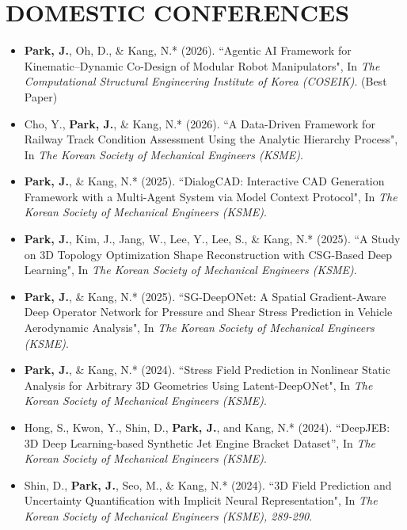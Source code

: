 \documentclass[a4paper,10pt]{article}
\begin{document}
\section*{DOMESTIC CONFERENCES}
\begin{itemize}[left=0pt]
    \item \textbf{Park, J.}, Oh, D., \& Kang, N.* (2026). “Agentic AI Framework for Kinematic--Dynamic Co-Design of Modular Robot Manipulators", In \textit{The Computational Structural Engineering Institute of Korea (COSEIK)}. (Best Paper)

    \item Cho, Y., \textbf{Park, J.}, \& Kang, N.* (2026). “A Data-Driven Framework for Railway Track Condition Assessment Using the Analytic Hierarchy Process", In \textit{The Korean Society of Mechanical Engineers (KSME)}.

    \item \textbf{Park, J.}, \& Kang, N.* (2025). “DialogCAD: Interactive CAD Generation Framework with a Multi-Agent System via Model Context Protocol", In \textit{The Korean Society of Mechanical Engineers (KSME)}.

    \item \textbf{Park, J.}, Kim, J., Jang, W., Lee, Y., Lee, S., \& Kang, N.* (2025). “A Study on 3D Topology Optimization Shape Reconstruction with CSG-Based Deep Learning", In \textit{The Korean Society of Mechanical Engineers (KSME)}.

    \item \textbf{Park, J.}, \& Kang, N.* (2025). “SG-DeepONet: A Spatial Gradient-Aware Deep Operator Network for Pressure and Shear Stress Prediction in Vehicle Aerodynamic Analysis", In \textit{The Korean Society of Mechanical Engineers (KSME)}.
    
    \item \textbf{Park, J.}, \& Kang, N.* (2024). “Stress Field Prediction in Nonlinear Static Analysis for Arbitrary 3D Geometries Using Latent-DeepONet", In \textit{The Korean Society of Mechanical Engineers (KSME)}.
    
    \item Hong, S., Kwon, Y., Shin, D., \textbf{Park, J.}, and Kang, N.* (2024). “DeepJEB: 3D Deep Learning-based Synthetic Jet Engine Bracket Dataset”, In \textit{The Korean Society of Mechanical Engineers (KSME)}.
    
    \item Shin, D., \textbf{Park, J.}, Seo, M., \& Kang, N.* (2024). “3D Field Prediction and Uncertainty Quantification with Implicit Neural Representation", In \textit{The Korean Society of Mechanical Engineers (KSME), 289-290}.
    

\end{itemize}
\end{document}
